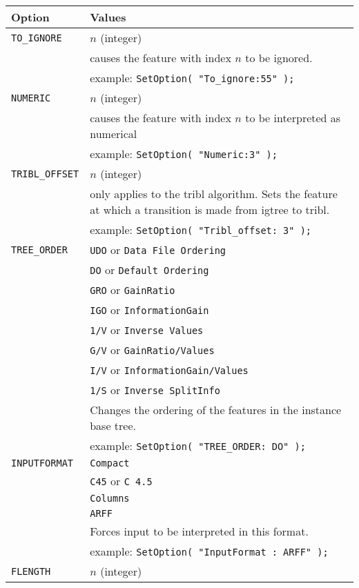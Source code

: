 \documentclass{report}
\begin{document}
\begin{tabular}{|l|p{12cm}|}
\hline
Option & Values\\
\hline
{\tt TO\_IGNORE}	 & $n$ (integer)\\
		 & causes the feature with index $n$ to be ignored.\\
		 & example: {\tt SetOption( "To\_ignore:55" );}\\
\hline
{\tt NUMERIC}	 & $n$ (integer)\\
		 & causes the feature with index $n$ to be interpreted as numerical\\
		 & example: {\tt SetOption( "Numeric:3" );}\\
\hline
{\tt TRIBL\_OFFSET} & $n$ (integer)\\
		 & only applies to the {\sc tribl} algorithm. Sets the
feature at which a transition is made from {\sc igtree} to {\sc tribl}.\\
		 & example: {\tt SetOption( "Tribl\_offset: 3" );}\\
\hline
{\tt TREE\_ORDER} & {\tt UDO} or {\tt Data File Ordering}\\ 
                 & {\tt DO}  or {\tt Default Ordering}\\ 
                 & {\tt GRO} or {\tt GainRatio}\\ 
                 & {\tt IGO} or {\tt InformationGain}\\ 
                 & {\tt 1/V} or {\tt Inverse Values}\\ 
                 & {\tt G/V} or {\tt GainRatio/Values}\\ 
                 & {\tt I/V} or {\tt InformationGain/Values}\\ 
                 & {\tt 1/S} or {\tt Inverse SplitInfo}\\  
		 & Changes the ordering of the features in the instance base tree.\\
		 & example: {\tt SetOption( "TREE\_ORDER: DO" );}\\
\hline
{\tt INPUTFORMAT} & {\tt Compact}\\
                  & {\tt C45} or {\tt C 4.5}\\
                  & {\tt Columns}\\
                  & {\tt ARFF}\\
		  & Forces input to be interpreted in this format.\\
		  & example: {\tt SetOption( "InputFormat : ARFF" );}\\
\hline
{\tt FLENGTH}     & $n$ (integer)\\

\end{tabular}
\end{document}
